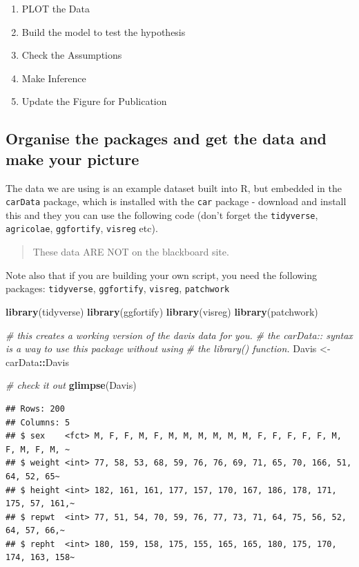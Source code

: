 \documentclass[
]{book}
\newenvironment{Shaded}{\begin{snugshade}}{\end{snugshade}}
\newcommand{\CommentTok}[1]{\textcolor[rgb]{0.56,0.35,0.01}{\textit{#1}}}
\newcommand{\FunctionTok}[1]{\textcolor[rgb]{0.13,0.29,0.53}{\textbf{#1}}}
\newcommand{\NormalTok}[1]{#1}
\newcommand{\OtherTok}[1]{\textcolor[rgb]{0.56,0.35,0.01}{#1}}
\newcommand{\SpecialCharTok}[1]{\textcolor[rgb]{0.81,0.36,0.00}{\textbf{#1}}}
\providecommand{\tightlist}{%
  \setlength{\itemsep}{0pt}\setlength{\parskip}{0pt}}
\begin{document}
\begin{enumerate}
\def\labelenumi{\arabic{enumi})}
\tightlist
\item
  PLOT the Data
\item
  Build the model to test the hypothesis
\item
  Check the Assumptions
\item
  Make Inference
\item
  Update the Figure for Publication
\end{enumerate}

\subsection{Organise the packages and get the data and make your picture}\label{organise-the-packages-and-get-the-data-and-make-your-picture}

The data we are using is an example dataset built into R, but embedded in the \texttt{carData} package, which is installed with the \texttt{car} package - download and install this and they you can use the following code (don't forget the \texttt{tidyverse}, \texttt{agricolae}, \texttt{ggfortify}, \texttt{visreg} etc).

\begin{quote}
These data ARE NOT on the blackboard site.
\end{quote}

Note also that if you are building your own script, you need the following packages: \texttt{tidyverse}, \texttt{ggfortify}, \texttt{visreg}, \texttt{patchwork}

\begin{Shaded}
\begin{Highlighting}[]
\FunctionTok{library}\NormalTok{(tidyverse)}
\FunctionTok{library}\NormalTok{(ggfortify)}
\FunctionTok{library}\NormalTok{(visreg)}
\FunctionTok{library}\NormalTok{(patchwork)}

\CommentTok{\# this creates a working version of the davis data for you.}
\CommentTok{\# the carData:: syntax is a way to use this package without using}
\CommentTok{\# the library() function.}
\NormalTok{Davis }\OtherTok{\textless{}{-}}\NormalTok{ carData}\SpecialCharTok{::}\NormalTok{Davis}

\CommentTok{\# check it out}
\FunctionTok{glimpse}\NormalTok{(Davis)}
\end{Highlighting}
\end{Shaded}

\begin{verbatim}
## Rows: 200
## Columns: 5
## $ sex    <fct> M, F, F, M, F, M, M, M, M, M, M, F, F, F, F, F, M, F, M, F, M, ~
## $ weight <int> 77, 58, 53, 68, 59, 76, 76, 69, 71, 65, 70, 166, 51, 64, 52, 65~
## $ height <int> 182, 161, 161, 177, 157, 170, 167, 186, 178, 171, 175, 57, 161,~
## $ repwt  <int> 77, 51, 54, 70, 59, 76, 77, 73, 71, 64, 75, 56, 52, 64, 57, 66,~
## $ repht  <int> 180, 159, 158, 175, 155, 165, 165, 180, 175, 170, 174, 163, 158~
\end{verbatim}
\end{document}
